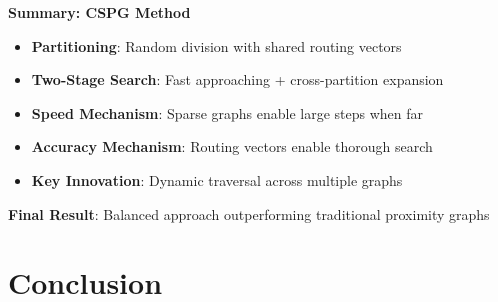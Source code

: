 \begin{frame}
\begin{center}
\Large\textbf{Summary: CSPG Method}
\end{center}

\vspace{0.3cm}

\begin{itemize}
    \item \textbf{Partitioning}: Random division with shared routing vectors
    \item \textbf{Two-Stage Search}: Fast approaching + cross-partition expansion
    \item \textbf{Speed Mechanism}: Sparse graphs enable large steps when far
    \item \textbf{Accuracy Mechanism}: Routing vectors enable thorough search
    \item \textbf{Key Innovation}: Dynamic traversal across multiple graphs
\end{itemize}

\vspace{0.3cm}

\textbf{Final Result}: Balanced approach outperforming traditional proximity graphs
\end{frame}%
\section{Conclusion}%

